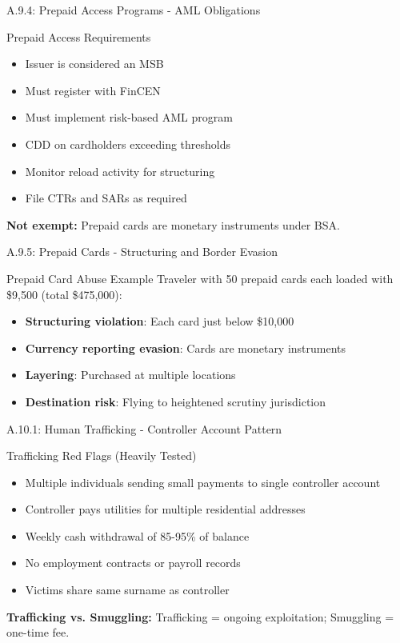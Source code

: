 \documentclass{beamer}
\begin{document}
	\begin{frame}{A.9.4: Prepaid Access Programs - AML Obligations}
		\begin{block}{Prepaid Access Requirements}
			\begin{itemize}
				\item Issuer is considered an MSB
				\item Must register with FinCEN
				\item Must implement risk-based AML program
				\item CDD on cardholders exceeding thresholds
				\item Monitor reload activity for structuring
				\item File CTRs and SARs as required
			\end{itemize}
		\end{block}
		\textbf{Not exempt:} Prepaid cards are monetary instruments under BSA.
	\end{frame}
	
	\begin{frame}{A.9.5: Prepaid Cards - Structuring and Border Evasion}
		\begin{block}{Prepaid Card Abuse Example}
			Traveler with 50 prepaid cards each loaded with \$9,500 (total \$475,000):
			\begin{itemize}
				\item \textbf{Structuring violation}: Each card just below \$10,000
				\item \textbf{Currency reporting evasion}: Cards are monetary instruments
				\item \textbf{Layering}: Purchased at multiple locations
				\item \textbf{Destination risk}: Flying to heightened scrutiny jurisdiction
			\end{itemize}
		\end{block}
	\end{frame}
	
	
	\begin{frame}{A.10.1: Human Trafficking - Controller Account Pattern}
		\begin{block}{Trafficking Red Flags (Heavily Tested)}
			\begin{itemize}
				\item Multiple individuals sending small payments to single controller account
				\item Controller pays utilities for multiple residential addresses
				\item Weekly cash withdrawal of 85-95\% of balance
				\item No employment contracts or payroll records
				\item Victims share same surname as controller
			\end{itemize}
		\end{block}
		\textbf{Trafficking vs. Smuggling:} Trafficking = ongoing exploitation; Smuggling = one-time fee.
	\end{frame}
	
\end{document}
